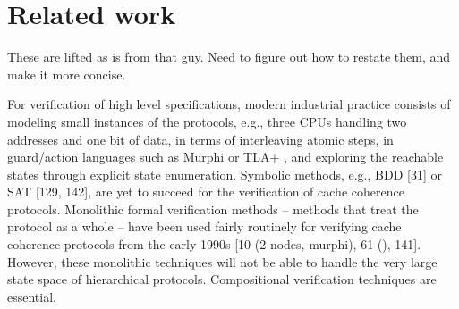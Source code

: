 \section{Related work}
\label{relatedWork}
These are lifted as is from that guy. Need to figure out how to restate them, and make it more concise.

For verification of high level specifications, modern industrial practice
consists of modeling small instances of the protocols, e.g., three CPUs
handling two addresses and one bit of data, in terms of interleaving atomic
steps, in guard/action languages such as Murphi \cite{tla} or TLA+ \cite{tla}, and
exploring the reachable states through explicit state enumeration.
Symbolic methods, e.g., BDD [31] or SAT [129, 142], are yet to succeed for the
verification of cache coherence protocols.
Monolithic formal verification methods – methods that treat the protocol as a whole – have
been used fairly routinely for verifying cache coherence protocols from the early 1990s
[10 (2 nodes, murphi), 61 (), 141]. However, these monolithic techniques will not be able to handle the very
large state space of hierarchical protocols. Compositional verification techniques are essential. 


